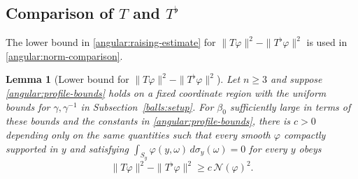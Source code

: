 \documentclass[11pt,a4paper]{article}
\newtheorem{lemma}[theorem]{Lemma}
\theoremstyle{definition}
\theoremstyle{remark}
\numberwithin{equation}{section}
\begin{document}
\subsection{Comparison of \texorpdfstring{$T$ and $T^\flat$}{T and T-flat}}

The lower bound in \eqref{angular:raising-estimate} for
$\|T\varphi\|^2-\|T^\flat\varphi\|^2$ is used in
\eqref{angular:norm-comparison}.

\begin{lemma}[Lower bound for $\|T\varphi\|^2-\|T^\flat\varphi\|^2$]\label{angular:raising}
Let $n\ge3$ and suppose \eqref{angular:profile-bounds} holds on a fixed
coordinate region with the uniform bounds for $\gamma,\gamma^{-1}$ in
Subsection~\ref{balls:setup}. For $\beta_0$ sufficiently large in
terms of these bounds and the constants in \eqref{angular:profile-bounds},
there is $c>0$ depending only on the same quantities such that
every smooth $\varphi$
compactly supported in $y$ and satisfying
$\int_{S_y}\varphi(y,\omega)\,d\sigma_y(\omega)=0$ for every $y$ obeys
\begin{equation}\label{angular:raising-estimate}
 \|T\varphi\|^2-\|T^\flat\varphi\|^2
       \ge c\,\mathcal N(\varphi)^2.
\end{equation}
\end{lemma}
\end{document}

